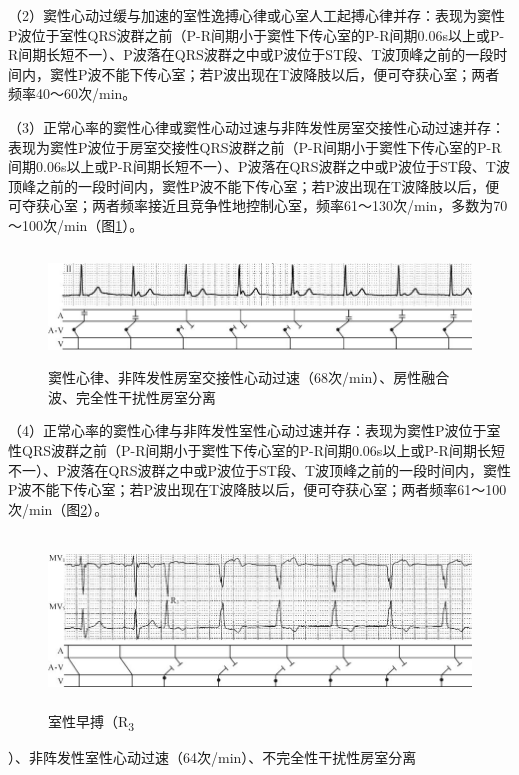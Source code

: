 （2）窦性心动过缓与加速的室性逸搏心律或心室人工起搏心律并存：表现为窦性P波位于室性QRS波群之前（P-R间期小于窦性下传心室的P-R间期0.06s以上或P-R间期长短不一）、P波落在QRS波群之中或P波位于ST段、T波顶峰之前的一段时间内，窦性P波不能下传心室；若P波出现在T波降肢以后，便可夺获心室；两者频率40～60次/min。

（3）正常心率的窦性心律或窦性心动过速与非阵发性房室交接性心动过速并存：表现为窦性P波位于房室交接性QRS波群之前（P-R间期小于窦性下传心室的P-R间期0.06s以上或P-R间期长短不一）、P波落在QRS波群之中或P波位于ST段、T波顶峰之前的一段时间内，窦性P波不能下传心室；若P波出现在T波降肢以后，便可夺获心室；两者频率接近且竞争性地控制心室，频率61～130次/min，多数为70～100次/min（图\ref{fig26-11}）。

\begin{figure}[!htbp]
 \centering
 \includegraphics[width=5.78125in,height=1.1875in]{./images/Image00452.jpg}
 \captionsetup{justification=centering}
 \caption{窦性心律、非阵发性房室交接性心动过速（68次/min）、房性融合波、完全性干扰性房室分离}
 \label{fig26-11}
  \end{figure} 

（4）正常心率的窦性心律与非阵发性室性心动过速并存：表现为窦性P波位于室性QRS波群之前（P-R间期小于窦性下传心室的P-R间期0.06s以上或P-R间期长短不一）、P波落在QRS波群之中或P波位于ST段、T波顶峰之前的一段时间内，窦性P波不能下传心室；若P波出现在T波降肢以后，便可夺获心室；两者频率61～100次/min（图\ref{fig26-12}）。

\begin{figure}[!htbp]
 \centering
 \includegraphics[width=5.80208in,height=1.8125in]{./images/Image00453.jpg}
 \captionsetup{justification=centering}
 \caption{室性早搏（R\textsubscript{3}}
 \label{fig26-12}
  \end{figure} 
）、非阵发性室性心动过速（64次/min）、不完全性干扰性房室分离

